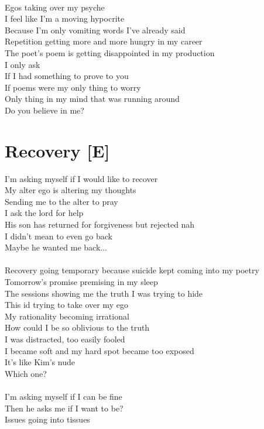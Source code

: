 \documentclass[12pt, b5paper, oneside]{book}
\begin{document}
\\Egos taking over my psyche
\\I feel like I'm a moving hypocrite
\\Because I'm only vomiting words I've already said
\\Repetition getting more and more hungry in my career
\\The poet's poem is getting disappointed in my production
\\I only ask
\\If I had something to prove to you
\\If poems were my only thing to worry
\\Only thing in my mind that was running around
\\Do you believe in me? 
\newpage
\section{Recovery [E]}
I'm asking myself if I would like to recover
\\My alter ego is altering my thoughts 
\\Sending me to the alter to pray
\\I ask the lord for help
\\His son has returned for forgiveness but rejected nah
\\I didn't mean to even go back
\\Maybe he wanted me back...
%
\\\\Recovery going temporary because suicide kept coming into my poetry
\\Tomorrow's promise premising in my sleep
\\The sessions showing me the truth I was trying to hide
\\This id trying to take over my ego
\\My rationality becoming irrational
\\How could I be so oblivious to the truth
\\I was distracted, too easily fooled
\\I became soft and my hard spot became too exposed
\\It's like Kim's nude
\\Which one?
%
\\\\I'm asking myself if I can be fine
\\Then he asks me if I want to be?
\\Issues going into tissues
\end{document}
